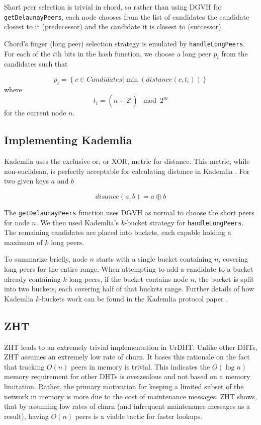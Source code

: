 \documentclass[11pt,conference]{IEEEtran}
\begin{document}
Short peer selection is trivial in chord, so rather than using DGVH for \texttt{getDelaunayPeers}, each node chooses  from the list of candidates the candidate closest to it (predecessor) and the candidate it is closest to (successor).

Chord's finger (long peer) selection strategy is emulated by \texttt{handleLongPeers}.
For each of the $i$th bits in the hash function, we choose a long peer $ p_i $ from the candidates such that 


\[ p_i = \left\{c \in Candidates |  \min\left(distance(c, t_{i})\right) \right\}  \]
where
\[t_{i} =  (n + 2^{i}) \mod 2^m \]
for the current node $n$.



\subsection{Implementing Kademlia}
Kademlia uses the exclusive or, or XOR, metric for distance.
This metric, while non-euclidean, is perfectly acceptable for calculating distance in Kademlia \cite{kademlia}.
For two given keys $ a $ and $ b $

\[ disance(a, b) = a  \oplus b\]

The \texttt{getDelaunayPeers} function uses DGVH as normal to choose the short peers for node $n$.
We then used Kademlia's $k$-bucket strategy \cite{kademlia} for \texttt{handleLongPeers}.
The remaining candidates are placed into buckets, each capable holding a maximum of $k$ long peers.

To summarize briefly, node $n$ starts with a single bucket containing $n$, covering long peers for the entire range.
When attempting to add a candidate to a bucket already containing $k$ long peers, if the bucket contains node $n$, the bucket is split into two buckets, each covering half of that buckets range.
Further details of how Kademlia $k$-buckets work can be found in the Kademlia protocol paper \cite{kademlia}.


\subsection{ZHT}
ZHT \cite{li2013zht} leads to an extremely trivial implementation in UrDHT.
Unlike other DHTs, ZHT assumes an extremely low rate of churn.
It bases this rationale on the fact that tracking $ O(n) $ peers in memory is trivial.
This indicates the $ O( \log n)  $  memory  requirement for other DHTs is overzealous and not based on a memory limitation.
Rather, the primary motivation for keeping a limited subset of the network in memory is more due to the cost of maintenance messages.
ZHT shows, that by assuming low rates of churn (and infrequent maintenance messages as a result), having $O(n)$ peers is a viable tactic for faster lookups.
\end{document}
